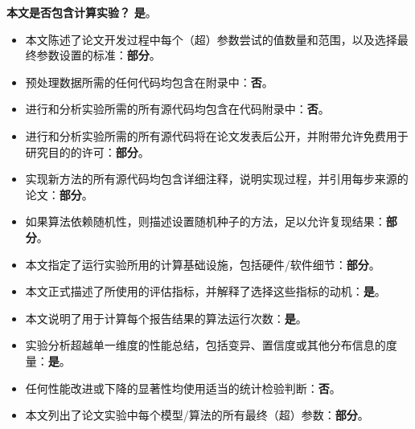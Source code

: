 ﻿\documentclass[letterpaper]{article}
\begin{document}
\noindent\textbf{本文是否包含计算实验？} \textbf{是}。
\begin{itemize}
\item 本文陈述了论文开发过程中每个（超）参数尝试的值数量和范围，以及选择最终参数设置的标准：\textbf{部分}。
\item 预处理数据所需的任何代码均包含在附录中：\textbf{否}。
\item 进行和分析实验所需的所有源代码均包含在代码附录中：\textbf{否}。
\item 进行和分析实验所需的所有源代码将在论文发表后公开，并附带允许免费用于研究目的的许可：\textbf{部分}。
\item 实现新方法的所有源代码均包含详细注释，说明实现过程，并引用每步来源的论文：\textbf{部分}。
\item 如果算法依赖随机性，则描述设置随机种子的方法，足以允许复现结果：\textbf{部分}。
\item 本文指定了运行实验所用的计算基础设施，包括硬件/软件细节：\textbf{部分}。
\item 本文正式描述了所使用的评估指标，并解释了选择这些指标的动机：\textbf{是}。
\item 本文说明了用于计算每个报告结果的算法运行次数：\textbf{是}。
\item 实验分析超越单一维度的性能总结，包括变异、置信度或其他分布信息的度量：\textbf{是}。
\item 任何性能改进或下降的显著性均使用适当的统计检验判断：\textbf{否}。
\item 本文列出了论文实验中每个模型/算法的所有最终（超）参数：\textbf{部分}。
\end{itemize}
\end{document}
